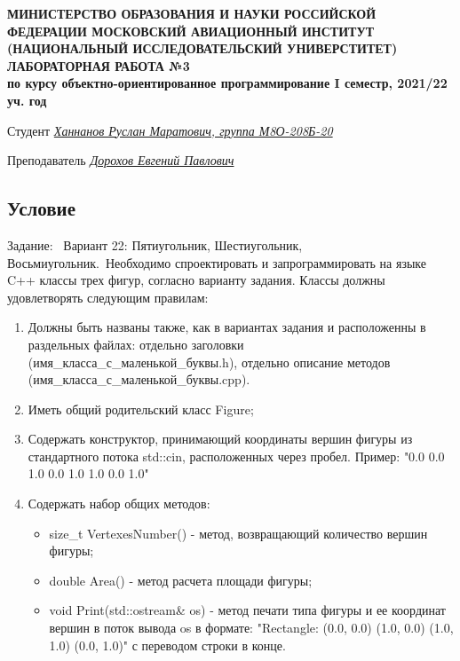 \documentclass[12pt]{article}
\begin{document}
\begin{titlepage}
\begin{center}
\textbf{МИНИСТЕРСТВО ОБРАЗОВАНИЯ И НАУКИ РОССИЙСКОЙ ФЕДЕРАЦИИ
\medskip
МОСКОВСКИЙ АВИАЦИОННЫЙ ИНСТИТУТ
(НАЦИОНАЛЬНЫЙ ИССЛЕДОВАТЕЛЬСКИЙ УНИВЕРСТИТЕТ)
\vfill\vfill
{\Huge ЛАБОРАТОРНАЯ РАБОТА №3} \\
по курсу объектно-ориентированное программирование
I семестр, 2021/22 уч. год}
\end{center}
\vfill

Студент \uline{\it {Ханнанов Руслан Маратович, группа М8О-208Б-20}\hfill}

Преподаватель \uline{\it {Дорохов Евгений Павлович}\hfill}

\vfill
\end{titlepage}

\subsection*{Условие}

Задание: \
Вариант 22: Пятиугольник, Шестиугольник, Восьмиугольник.\
Необходимо спроектировать и запрограммировать на языке C++ классы трех фигур, согласно варианту задания. Классы должны удовлетворять следующим правилам:
\begin{enumerate}
\item Должны быть названы также, как в вариантах задания и расположенны в раздельных файлах: отдельно заголовки (имя\_класса\_с\_маленькой\_буквы.h), отдельно описание методов (имя\_класса\_с\_маленькой\_буквы.cpp).
\item Иметь общий родительский класс Figure;
\item Содержать конструктор, принимающий координаты вершин фигуры из стандартного потока std::cin, расположенных через пробел. Пример: "0.0 0.0 1.0 0.0 1.0 1.0 0.0 1.0"
\item Содержать набор общих методов:
\begin{itemize}
    \item size\_t VertexesNumber() - метод, возвращающий количество вершин фигуры;
    \item double Area() - метод расчета площади фигуры;
    \item void Print(std::ostream& os) - метод печати типа фигуры и ее координат вершин в поток вывода os в формате: "Rectangle: (0.0, 0.0) (1.0, 0.0) (1.0, 1.0) (0.0, 1.0)" с переводом строки в конце.
\end{itemize}
\end{enumerate}
\end{document}
